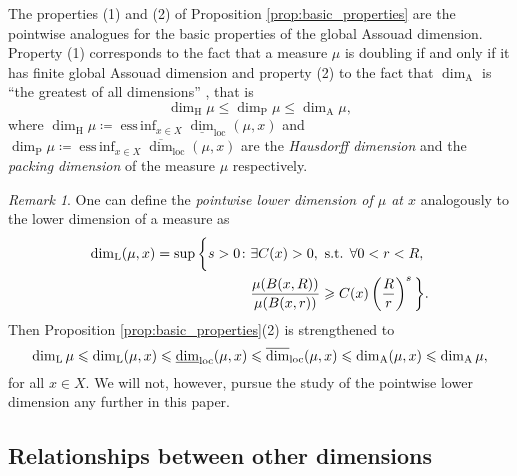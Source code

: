 \documentclass{PRM}
\newcommand{\updim}{\overline{\dim}}
\newcommand{\lowdim}{\underline{\dim}}
\newcommand{\adim}{\dim_{\mathrm{A}}}
\DeclareMathOperator*{\essinf}{ess\,inf}
\theoremstyle{plain}
\theoremstyle{definition}
\theoremstyle{remark}
\newtheorem{huom}[thm]{Remark}
\begin{document}
The properties (1) and (2) of Proposition \ref{prop:basic_properties} are the pointwise analogues for the basic properties of the global Assouad dimension. Property (1) corresponds to the fact that a measure $\mu$ is doubling if and only if it has finite global Assouad dimension and property (2) to the fact that $\adim$ is ``the greatest of all dimensions'' \cite{F}, that is
\begin{equation*}
    \dim_{\mathrm{H}}\mu\leq \dim_{\mathrm{P}}\mu\leq\adim\mu,
\end{equation*}
where $\dim_{\mathrm{H}}\mu\coloneqq\essinf_{x\in X}\lowdim_{\mathrm{loc}}(\mu,x)$ and $\dim_{\mathrm{P}}\mu\coloneqq\essinf_{x\in X}\updim_{\mathrm{loc}}(\mu,x)$ are the \emph{Hausdorff dimension} and the \emph{packing dimension} of the measure $\mu$ respectively.

\begin{huom}
One can define the \emph{pointwise lower dimension of $\mu$ at $x$} analogously to the lower dimension of a measure as
\begin{align*}
    \dim_{\mathrm{L}}(\mu,x)=\sup\bigg\{s>0\colon &\exists C(x)>0,\textnormal{ s.t. }\forall0<r<R,\\
    &\frac{\mu(B(x,R))}{\mu(B(x,r))}\geq C(x)\left(\frac{R}{r}\right)^s\bigg\}.
\end{align*}
Then Proposition \ref{prop:basic_properties}(2) is strengthened to 
\begin{equation*}
    \dim_{\mathrm{L}}\mu\leq\dim_{\mathrm{L}}(\mu,x)\leq\lowdim_{\textnormal{loc}}(\mu,x)\leq\updim_{\textnormal{loc}}(\mu,x)\leq \dim_{\mathrm{A}}(\mu,x)\leq\adim\mu,
\end{equation*}
for all $x\in X$. We will not, however, pursue the study of the pointwise lower dimension any further in this paper.
\end{huom}

\subsection{Relationships between other dimensions}
\end{document}
